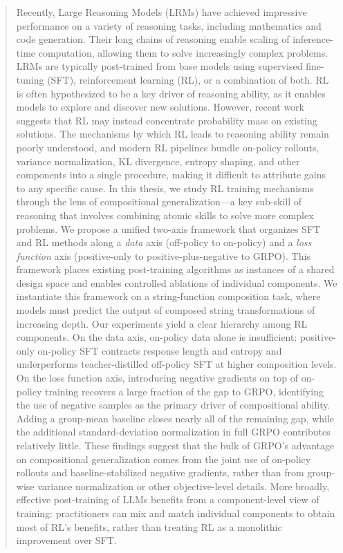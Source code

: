 \documentclass[12pt]{cmuthesis}
\begin{document}
\begin{abstract}
Recently, Large Reasoning Models (LRMs) have achieved impressive performance on a variety of reasoning tasks, including mathematics and code generation. Their long chains of reasoning enable scaling of inference-time computation, allowing them to solve increasingly complex problems. LRMs are typically post-trained from base models using supervised fine-tuning (SFT), reinforcement learning (RL), or a combination of both. RL is often hypothesized to be a key driver of reasoning ability, as it enables models to explore and discover new solutions. However, recent work suggests that RL may instead concentrate probability mass on existing solutions.
The mechanisms by which RL leads to reasoning ability remain poorly understood, and modern RL pipelines bundle on-policy rollouts, variance normalization, KL divergence, entropy shaping, and other components into a single procedure, making it difficult to attribute gains to any specific cause. In this thesis, we study RL training mechanisms through the lens of compositional generalization---a key sub-skill of reasoning that involves combining atomic skills to solve more complex problems.
We propose a unified two-axis framework that organizes SFT and RL methods along a \emph{data} axis (off-policy to on-policy) and a \emph{loss function} axis (positive-only to positive-plus-negative to GRPO). This framework places existing post-training algorithms as instances of a shared design space and enables controlled ablations of individual components. We instantiate this framework on a string-function composition task, where models must predict the output of composed string transformations of increasing depth.
Our experiments yield a clear hierarchy among RL components. On the data axis, on-policy data alone is insufficient: positive-only on-policy SFT contracts response length and entropy and underperforms teacher-distilled off-policy SFT at higher composition levels. On the loss function axis, introducing negative gradients on top of on-policy training recovers a large fraction of the gap to GRPO, identifying the use of negative samples as the primary driver of compositional ability. Adding a group-mean baseline closes nearly all of the remaining gap, while the additional standard-deviation normalization in full GRPO contributes relatively little.
These findings suggest that the bulk of GRPO's advantage on compositional generalization comes from the joint use of on-policy rollouts and baseline-stabilized negative gradients, rather than from group-wise variance normalization or other objective-level details. More broadly, effective post-training of LLMs benefits from a component-level view of training: practitioners can mix and match individual components to obtain most of RL's benefits, rather than treating RL as a monolithic improvement over SFT.
\end{abstract}
\end{document}
